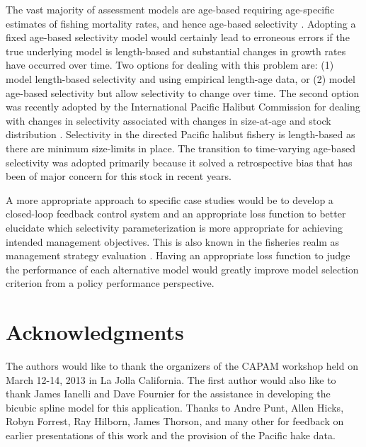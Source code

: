  The vast majority of assessment models are age-based requiring age-specific estimates of fishing mortality rates, and hence age-based selectivity \citep{gavaris2002sif}.  Adopting a fixed age-based selectivity model would certainly lead to erroneous errors if the true underlying model is length-based and substantial changes in growth rates have occurred over time.  Two options for dealing with this problem are: (1) model length-based selectivity and using empirical length-age data, or (2) model age-based selectivity but allow selectivity to change over time.  The second option was recently adopted by the International Pacific Halibut Commission for dealing with changes in selectivity associated with changes in size-at-age and stock distribution \citep{stewart2012assessment}.  Selectivity in the directed Pacific halibut fishery is length-based as there are minimum size-limits in place.  The transition to time-varying age-based selectivity was adopted primarily because it solved a retrospective bias that has been of major concern for this stock in recent years.


A more appropriate approach to specific case studies would be to develop a closed-loop feedback control system and an appropriate loss function to better elucidate which selectivity parameterization is more appropriate for achieving intended management objectives.  This is also known in the fisheries realm as management strategy evaluation \citep{de1986simulation,Cooke1999,smith1999implementing}.  Having an appropriate loss function to judge the performance of each alternative model would greatly improve model selection criterion from a policy performance perspective.


\section*{Acknowledgments} %
\label{sec:acknowledgments}
	The authors would like to thank the organizers of the CAPAM workshop held on March 12-14, 2013 in La Jolla California.  The first author would also like to thank James Ianelli and Dave Fournier for the assistance in developing the bicubic spline model for this application.  Thanks to Andre Punt, Allen Hicks, Robyn Forrest, Ray Hilborn, James Thorson, and many other for feedback on earlier presentations of this work and the provision of the Pacific hake data.
